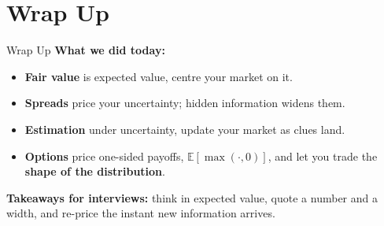 \section{Wrap Up}

\begin{frame}{Wrap Up}
  \textbf{What we did today:}
  \begin{itemize}
    \item \textbf{Fair value} is expected value, centre your market on it.
    \item \textbf{Spreads} price your uncertainty; hidden information widens them.
    \item \textbf{Estimation} under uncertainty, update your market as clues land.
    \item \textbf{Options} price one-sided payoffs, $\mathbb{E}[\max(\cdot,0)]$,
      and let you trade the \textbf{shape of the distribution}.
  \end{itemize}

  \vspace{0.2cm}
  \begin{sqt:definition}
    \textbf{Takeaways for interviews:} think in expected value, quote a number
    and a width, and re-price the instant new information arrives.
  \end{sqt:definition}

  \vspace{0.2cm}
  \begin{center}
  \end{center}
\end{frame}


